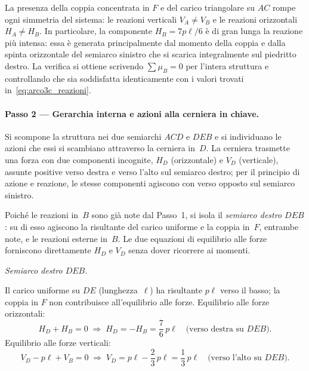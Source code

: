 \begin{oss}
	La presenza della coppia concentrata in $F$ e del
	carico triangolare su $AC$ rompe ogni simmetria
	del sistema: le reazioni verticali $V_A \neq V_B$
	e le reazioni orizzontali $H_A \neq H_B$.
	In particolare, la componente $H_B = 7p\ell/6$
	è di gran lunga la reazione più intensa:
	essa è generata principalmente dal momento della
	coppia e dalla spinta orizzontale del semiarco
	sinistro che si scarica integralmente sul piedritto
	destro.
	La verifica si ottiene scrivendo $\sum\mu_B = 0$
	per l'intera struttura e controllando che sia
	soddisfatta identicamente con i valori
	trovati in~\eqref{eq:arco3c_reazioni}.
\end{oss}

\paragraph{Passo 2 --- Gerarchia interna e azioni
	alla cerniera in chiave.}

Si scompone la struttura nei due semiarchi
$ACD$ e $DEB$ e si individuano le azioni che essi si
scambiano attraverso la cerniera in~$D$.
La cerniera trasmette una forza con due componenti
incognite, $H_D$ (orizzontale) e $V_D$ (verticale),
assunte positive verso destra e verso l'alto sul
semiarco destro; per il principio di azione e
reazione, le stesse componenti agiscono con verso
opposto sul semiarco sinistro.

Poiché le reazioni in~$B$ sono già note dal Passo~1,
si isola il \emph{semiarco destro $DEB$}: su di esso
agiscono la risultante del carico uniforme e la coppia
in~$F$, entrambe note, e le reazioni esterne in~$B$.
Le due equazioni di equilibrio alle forze forniscono
direttamente $H_D$ e $V_D$ senza dover ricorrere ai
momenti.

\medskip
\noindent\textit{Semiarco destro $DEB$.}

Il carico uniforme su $DE$ (lunghezza~$\ell$)
ha risultante $p\ell$ verso il basso;
la coppia in $F$ non contribuisce all'equilibrio
alle forze.
Equilibrio alle forze orizzontali:
\[
H_D + H_B = 0
\;\Rightarrow\;
H_D = -H_B = \frac{7}{6}\,p\ell
\quad\text{(verso destra su } DEB\text{)}.
\]
Equilibrio alle forze verticali:
\[
V_D - p\ell + V_B = 0
\;\Rightarrow\;
V_D = p\ell - \frac{2}{3}\,p\ell = \frac{1}{3}\,p\ell
\quad\text{(verso l'alto su } DEB\text{)}.
\]

